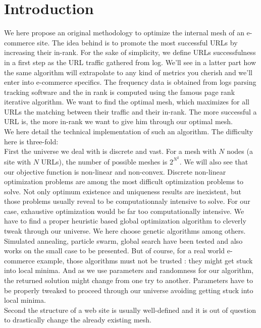 \documentclass{iSWAGArticle}
\begin{document}
\section{Introduction}
We here propose an original methodology to optimize the internal mesh of an e-commerce site.
The idea behind is to promote the most successful URLs by increasing their in-rank.  
For the sake of simplicity, we define URLs successfulness in a first step as the URL traffic gathered from log.
We'll see in a latter part how the same algorithm will extrapolate to any kind of metrics you cherish and we'll enter into e-commerce specifics.
The frequency data is obtained from logs parsing tracking software and the in rank is computed using the famous page rank iterative algorithm.  
We want to find the optimal mesh, which maximizes for all URLs the matching between their traffic and their in-rank. 
The more successful a URL is, the more in-rank we want to give him through our optimal mesh.
 \\\newline
We here detail the technical implementation of such an algorithm.
The difficulty here is three-fold:
\\
\indent
First the universe we deal with is discrete and vast. For a mesh with $N$ nodes (a site with $N$ URLs), the number of possible meshes is $2^{N^{2}}$. 
We will also see that our objective function is non-linear and non-convex.  Discrete non-linear optimization problems are among the most difficult optimization problems to solve. 
Not only optimum existence and uniqueness results are inexistent, but those problems usually reveal to be computationnaly intensive to solve. 
For our case, exhaustive optimization would be far too computationally intensive. We have to find a proper heuristic based global optimization algorithm to cleverly tweak through our universe.
We here choose genetic algorithms among others. Simulated annealing, particle swarm, global search have been tested and also works on the small case to be presented.
But of course, for a real world e-commerce example, those algorithms must not be trusted : they might get stuck into local minima. 
And as we use parameters and randomness for our algorithm, the returned solution might change from one try to another. 
Parameters have to be properly tweaked to proceed through our universe avoiding getting stuck into local minima.
\\
\indent
Second the structure of a web site is usually well-defined and it is out of question to drastically change the already existing mesh.
\end{document}
